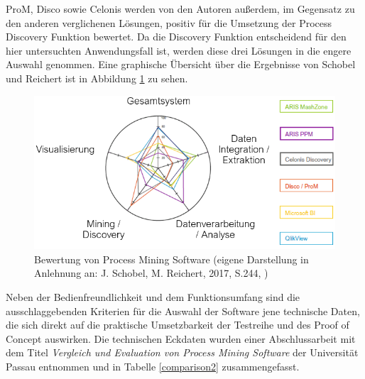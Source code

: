 ProM, Disco sowie Celonis werden von den Autoren außerdem, im Gegensatz zu den anderen verglichenen Lösungen, positiv für die Umsetzung der Process Discovery Funktion bewertet. Da die Discovery Funktion entscheidend für den hier untersuchten Anwendungsfall ist, werden diese drei Lösungen in die engere Auswahl genommen.
Eine graphische Übersicht über die Ergebnisse von Schobel und Reichert ist in Abbildung \ref{fig:toolEval} zu sehen.
\begin{figure}[!ht]
    \centering
    \includegraphics[scale=0.6]{figures/Appbildungen/toolEval.PNG}
    \caption{Bewertung von Process Mining Software (eigene Darstellung in Anlehnung an: J. Schobel, M. Reichert, 2017, S.244, \cite{Schobel2017})}
    \label{fig:toolEval}
\end{figure}

Neben der Bedienfreundlichkeit und dem Funktionsumfang sind die ausschlaggebenden Kriterien für die Auswahl der Software jene technische Daten, die sich direkt auf die praktische Umsetzbarkeit der Testreihe und des Proof of Concept auswirken. Die technischen Eckdaten wurden einer Abschlussarbeit mit dem Titel \textit{Vergleich und Evaluation von Process Mining Software} der Universität Passau entnommen \cite{compPM} und in Tabelle \ref{comparison2} zusammengefasst.

